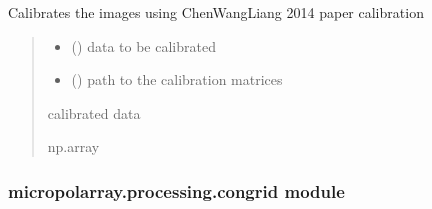 \documentclass[letterpaper,10pt,english]{sphinxmanual}
\begin{document}
\begin{fulllineitems}
\label{\detokenize{micropolarray.processing:micropolarray.processing.chen_wan_liang_calibration.chen_wan_liang_calibration}}
\pysigstartsignatures
{}
\pysigstopsignatures
\sphinxAtStartPar
Calibrates the images using Chen\sphinxhyphen{}Wang\sphinxhyphen{}Liang 2014 paper calibration
\begin{quote}\begin{description}
\begin{itemize}
\item {} 
\sphinxAtStartPar
{} () \textendash{} data to be calibrated

\item {} 
\sphinxAtStartPar
{} () \textendash{} path to the calibration matrices

\end{itemize}

\sphinxAtStartPar
calibrated data

\sphinxAtStartPar
np.array

\end{description}\end{quote}

\end{fulllineitems}



\subsubsection{micropolarray.processing.congrid module}
\label{\detokenize{micropolarray.processing:module-micropolarray.processing.congrid}}\label{\detokenize{micropolarray.processing:micropolarray-processing-congrid-module}}
\end{document}
